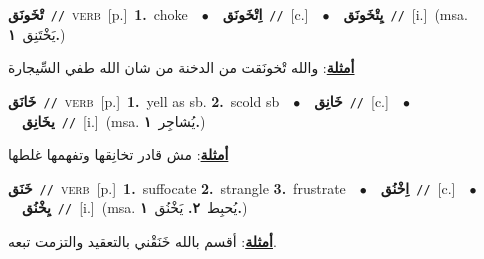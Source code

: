 \documentclass[10pt,a4paper,twoside]{article} %
\begin{document}
\begin{multicols}{2}
{\setlength\topsep{0pt}\textbf{\foreignlanguage{arabic}{تْخَونَق}}\ {\color{gray}\texttt{//}\color{black}}\ \textsc{verb}\ [p.]\ \textbf{1.}~choke\ \ $\bullet$\ \ \setlength\topsep{0pt}\textbf{\foreignlanguage{arabic}{اِتْخَونَق}}\ {\color{gray}\texttt{//}\color{black}}\ [c.]\ \ $\bullet$\ \ \setlength\topsep{0pt}\textbf{\foreignlanguage{arabic}{يِتْخَونَق}}\ {\color{gray}\texttt{//}\color{black}}\ [i.]\ \color{gray}(msa. \foreignlanguage{arabic}{يَخْتَنِق}~\foreignlanguage{arabic}{\textbf{١.}})\color{black}\  \begin{flushright}\color{gray}\foreignlanguage{arabic}{\textbf{\underline{\foreignlanguage{arabic}{أمثلة}}}: والله تْخونَقت من الدخنة من شان الله طفي السِّيجارة}\end{flushright}\color{black}} \vspace{2mm}

{\setlength\topsep{0pt}\textbf{\foreignlanguage{arabic}{خَانَق}}\ {\color{gray}\texttt{//}\color{black}}\ \textsc{verb}\ [p.]\ \textbf{1.}~yell as sb.  \textbf{2.}~scold sb\ \ $\bullet$\ \ \setlength\topsep{0pt}\textbf{\foreignlanguage{arabic}{خَانِق}}\ {\color{gray}\texttt{//}\color{black}}\ [c.]\ \ $\bullet$\ \ \setlength\topsep{0pt}\textbf{\foreignlanguage{arabic}{يخَانِق}}\ {\color{gray}\texttt{//}\color{black}}\ [i.]\ \color{gray}(msa. \foreignlanguage{arabic}{يُشاجِر}~\foreignlanguage{arabic}{\textbf{١.}})\color{black}\  \begin{flushright}\color{gray}\foreignlanguage{arabic}{\textbf{\underline{\foreignlanguage{arabic}{أمثلة}}}: مش قادر تخانِقها وتفهمها غلطها}\end{flushright}\color{black}} \vspace{2mm}

{\setlength\topsep{0pt}\textbf{\foreignlanguage{arabic}{خَنَق}}\ {\color{gray}\texttt{//}\color{black}}\ \textsc{verb}\ [p.]\ \textbf{1.}~suffocate  \textbf{2.}~strangle  \textbf{3.}~frustrate\ \ $\bullet$\ \ \setlength\topsep{0pt}\textbf{\foreignlanguage{arabic}{اِخْنُق}}\ {\color{gray}\texttt{//}\color{black}}\ [c.]\ \ $\bullet$\ \ \setlength\topsep{0pt}\textbf{\foreignlanguage{arabic}{يِخْنُق}}\ {\color{gray}\texttt{//}\color{black}}\ [i.]\ \color{gray}(msa. \foreignlanguage{arabic}{يُحبِط}~\foreignlanguage{arabic}{\textbf{٢.}}  \foreignlanguage{arabic}{يَخْنُق}~\foreignlanguage{arabic}{\textbf{١.}})\color{black}\  \begin{flushright}\color{gray}\foreignlanguage{arabic}{\textbf{\underline{\foreignlanguage{arabic}{أمثلة}}}: أقسم بالله خَنَقْني بالتعقيد والتزمت تبعه.}\end{flushright}\color{black}} \vspace{2mm}


\end{multicols}
\end{document}
